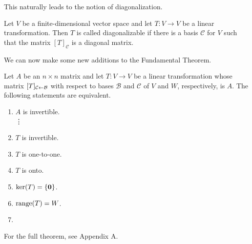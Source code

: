 \documentclass[../m073main.tex]{subfiles}
\begin{document}
This naturally leads to the notion of diagonalization.

\begin{definition}
	Let $V$ be a finite-dimensional vector space and let $T : V \to V$ be a linear transformation.
	Then $T$ is called diagonalizable if there is a basis $\mathcal{C}$ for $V$ such that the matrix $[T]_{\mathcal{C}}$ is a diagonal matrix.
\end{definition}

We can now make some new additions to the Fundamental Theorem.

\begin{theorem}
	Let $A$ be an $n\times n$ matrix and let $T : V \to V$ be a linear transformation whose matrix $[T]_{\mathcal{C} \leftarrow \mathcal{B}}$ with respect to bases $\mathcal{B}$ and $\mathcal{C}$ of $V$ and $W$, respectively, is $A$.
	The following statements are equivalent.
	\begin{multicols}{2}
		\begin{enumerate}[label=(\alph*)]
			\item $A$ is invertible. \\
			\phantom{~}\hspace{-19.5pt} \vdots
			\setcounter{enumi}{15}
			\item $T$ is invertible.
			\item $T$ is one-to-one.
			\item $T$ is onto.
			\item $\operatorname{ker}(T) = \{\mathbf{0}\}$.
			\item $\operatorname{range}(T) = W$.
			\item[]
		\end{enumerate}
	\end{multicols}
	For the full theorem, see Appendix A.
\end{theorem}
\end{document}
